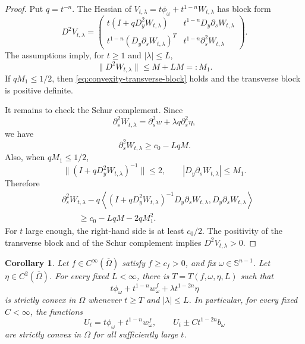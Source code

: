 \documentclass[11pt]{article}
\numberwithin{equation}{section}
\newtheorem{corollary}[theorem]{Corollary}
\newcommand{\Sn}{\mathbb S^{n-1}}
\begin{document}
\begin{proof}
Put \(q=t^{-n}\).  The Hessian of \(V_{t,\lambda}=t\phi_\omega+t^{1-n}W_{t,\lambda}\) has block form
\begin{equation}\label{eq:hessian-block-form-convexity}
    D^2V_{t,\lambda}
    =
    \begin{pmatrix}
        t(I+qD_y^2W_{t,\lambda})
        &
        t^{1-n}D_y\partial_sW_{t,\lambda} \\
        t^{1-n}(D_y\partial_sW_{t,\lambda})^T
        &
        t^{1-n}\partial_s^2W_{t,\lambda}
    \end{pmatrix}.
\end{equation}
The assumptions imply, for \(t\ge1\) and \(|\lambda|\le L\),
\[
    \|D^2W_{t,\lambda}\|
    \le
    M+LM
    =:M_1 .
\]
If \(qM_1\le1/2\), then \eqref{eq:convexity-transverse-block} holds and the transverse block is positive definite.

It remains to check the Schur complement.  Since
\[
    \partial_s^2W_{t,\lambda}
    =
    \partial_s^2w+\lambda q\partial_s^2\eta,
\]
we have
\[
    \partial_s^2W_{t,\lambda}
    \ge
    c_0-LqM .
\]
Also, when \(qM_1\le1/2\),
\[
    \|(I+qD_y^2W_{t,\lambda})^{-1}\|\le2,
    \qquad
    |D_y\partial_sW_{t,\lambda}|\le M_1 .
\]
Therefore
\[
\begin{aligned}
    &\partial_s^2W_{t,\lambda}
    -q
    \left\langle
        (I+qD_y^2W_{t,\lambda})^{-1}D_y\partial_sW_{t,\lambda},
        D_y\partial_sW_{t,\lambda}
    \right\rangle \\
    &\qquad\ge
    c_0-LqM-2qM_1^2 .
\end{aligned}
\]
For \(t\) large enough, the right-hand side is at least \(c_0/2\).  The positivity of the transverse block and of the Schur complement implies \(D^2V_{t,\lambda}>0\).
\end{proof}

\begin{corollary}\label{cor:model-profile-convexity}
Let \(f\in C^\infty(\overline\Omega)\) satisfy \(f\ge c_f>0\), and fix \(\omega\in\Sn\).  Let \(\eta\in C^2(\overline\Omega)\).  For every fixed \(L<\infty\), there is \(T=T(f,\omega,\eta,L)\) such that
\[
    t\phi_\omega+t^{1-n}w_\omega^f+\lambda t^{1-2n}\eta
\]
is strictly convex in \(\Omega\) whenever \(t\ge T\) and \(|\lambda|\le L\).  In particular, for every fixed \(C<\infty\), the functions
\[
    U_t=t\phi_\omega+t^{1-n}w_\omega^f,
    \qquad
    U_t\pm C t^{1-2n}b_\omega
\]
are strictly convex in \(\Omega\) for all sufficiently large \(t\).
\end{corollary}
\end{document}

